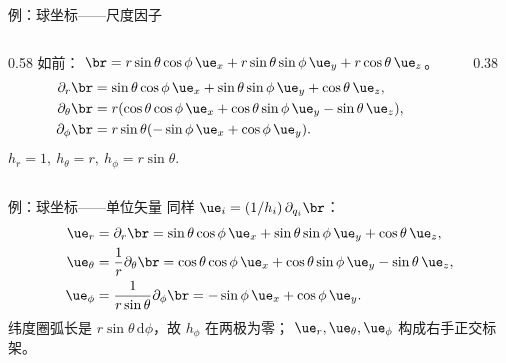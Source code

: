 \documentclass[fontset=windows, chinese, 10pt, xcolor=dvipsnames]{beamer}
\begin{document}
\begin{frame}{例：球坐标——尺度因子}
  \begin{columns}[T]
    \begin{column}{0.58\textwidth}
      {\small
      如前：
      $\br=r\sin\theta\cos\phi\,\ue_x+r\sin\theta\sin\phi\,\ue_y+r\cos\theta\,\ue_z$。
      \begin{align*}
        \partial_r\br
        &=\sin\theta\cos\phi\,\ue_x+\sin\theta\sin\phi\,\ue_y+\cos\theta\,\ue_z,\\
        \partial_\theta\br
        &=r(\cos\theta\cos\phi\,\ue_x+\cos\theta\sin\phi\,\ue_y-\sin\theta\,\ue_z),\\
        \partial_\phi\br
        &=r\sin\theta(-\sin\phi\,\ue_x+\cos\phi\,\ue_y).
      \end{align*}
      $\boxed{h_r=1,\ h_{\theta}=r,\ h_{\phi}=r\sin\theta.}$}
    \end{column}
    \begin{column}{0.38\textwidth}
      \centering
      \scalebox{0.82}{}
    \end{column}
  \end{columns}
\end{frame}

\begin{frame}{例：球坐标——单位矢量}
  同样 $\ue_i=(1/h_i)\,\partial_{q_i}\br$：
  \begin{align*}
    \ue_r
    &=\partial_r\br
    =\sin\theta\cos\phi\,\ue_x+\sin\theta\sin\phi\,\ue_y+\cos\theta\,\ue_z,\\
    \ue_{\theta}
    &=\frac{1}{r}\partial_\theta\br
    =\cos\theta\cos\phi\,\ue_x+\cos\theta\sin\phi\,\ue_y-\sin\theta\,\ue_z,\\
    \ue_{\phi}
    &=\frac{1}{r\sin\theta}\partial_\phi\br
    =-\sin\phi\,\ue_x+\cos\phi\,\ue_y.
  \end{align*}
  纬度圈弧长是 $r\sin\theta\,\mathrm{d}\phi$，故 $h_{\phi}$ 在两极为零；
  $\ue_r,\ue_{\theta},\ue_{\phi}$ 构成右手正交标架。
\end{frame}
\end{document}
